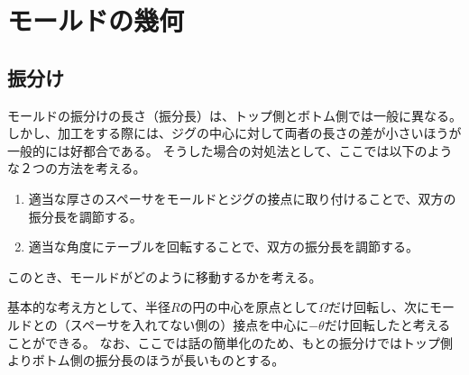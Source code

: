 \part{モールドの幾何}



\chapter{振分け}
モールドの振分けの長さ（振分長）は、トップ側とボトム側では一般に異なる。
しかし、加工をする際には、ジグの中心に対して両者の長さの差が小さいほうが一般的には好都合である。
そうした場合の対処法として、ここでは以下のような２つの方法を考える。
\begin{enumerate}
\item
適当な厚さのスペーサをモールドとジグの接点に取り付けることで、双方の振分長を調節する。
\item
適当な角度にテーブルを回転することで、双方の振分長を調節する。
\end{enumerate}
このとき、モールドがどのように移動するかを考える。

基本的な考え方として、半径$R$の円の中心を原点として$\Omega$だけ回転し、次にモールドとの（スペーサを入れてない側の）接点を中心に$-\theta$だけ回転したと考えることができる。
なお、ここでは話の簡単化のため、もとの振分けではトップ側よりボトム側の振分長のほうが長いものとする。




